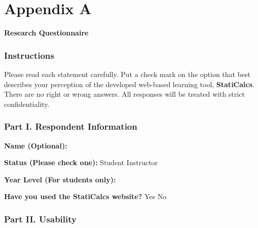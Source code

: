 \appendix

\chapter{Appendix A}\label{appendix:A}
\thispagestyle{backmatter}

\begin{center}
\textbf{Research Questionnaire}
\end{center}
\subsection*{Instructions}
Please read each statement carefully. Put a check mark on the option that best describes your perception of the developed web-based learning tool, \textbf{StatiCalcs}. There are no right or wrong answers. All responses will be treated with strict confidentiality.

\subsection*{Part I. Respondent Information}

\noindent
\textbf{Name (Optional):} \underline{\hspace{8cm}}

\vspace{0.3cm}

\noindent
\textbf{Status (Please check one):} \hspace{0.5cm} \fbox{\rule{0pt}{0.3cm}\rule{0.3cm}{0pt}} Student \hspace{0.5cm} \fbox{\rule{0pt}{0.3cm}\rule{0.3cm}{0pt}} Instructor

\vspace{0.3cm}

\noindent
\textbf{Year Level (For students only):} \underline{\hspace{8cm}}

\vspace{0.3cm}

\noindent
\textbf{Have you used the StatiCalcs website?} \hspace{0.5cm} \fbox{\rule{0pt}{0.3cm}\rule{0.3cm}{0pt}} Yes \hspace{0.5cm} \fbox{\rule{0pt}{0.3cm}\rule{0.3cm}{0pt}} No



\subsection*{Part II. Usability}


